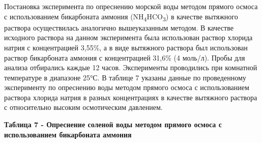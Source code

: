 Постановка эксперимента по опреснению морской воды методом прямого
осмоса с использованием бикарбоната аммония
(NH\textsubscript{4}HCO\textsubscript{3}) в качестве вытяжного раствора
осуществилась аналогично вышеуказанным методом. В качестве исходного
раствора на данном эксперимента была использован раствор хлорида натрия
с концентрацией 3,55\%, а в виде вытяжного раствора был использован
раствор бикарбоната аммония с концентрацией 31,6\% (4 моль/л). Пробы для
анализа отбирались каждые 12 часов. Эксперименты проводились при
комнатной температуре в диапазоне 25°С. В таблице 7 указаны данные по
проведенному эксперименту по опреснению воды методом прямого осмоса с
использованием раствора хлорида натрия в разных концентрациях в качестве
вытяжного раствора с относительно высоким осмотическим давлением.

{\bfseries Таблица 7 - Опреснение соленой воды методом прямого осмоса с
использованием бикарбоната аммония}

